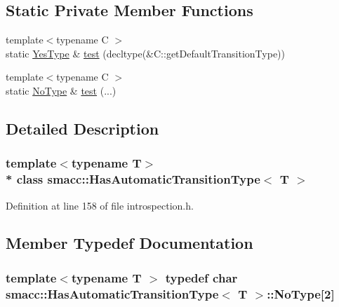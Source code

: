\subsection*{Static Private Member Functions}
\begin{DoxyCompactItemize}
\item 
{\footnotesize template$<$typename C $>$ }\\static \hyperlink{classsmacc_1_1HasAutomaticTransitionType_a0261cbc759cb52b6f60495d327a088a4}{Yes\+Type} \& \hyperlink{classsmacc_1_1HasAutomaticTransitionType_a21a21f4a8b478bd1a5305535c67dbc03}{test} (decltype(\&C\+::get\+Default\+Transition\+Type))
\item 
{\footnotesize template$<$typename C $>$ }\\static \hyperlink{classsmacc_1_1HasAutomaticTransitionType_a28c6f5359a0ce283d8f5705ed9fb0ceb}{No\+Type} \& \hyperlink{classsmacc_1_1HasAutomaticTransitionType_a86960eaf67ddae215927bc92d91a37f2}{test} (...)
\end{DoxyCompactItemize}


\subsection{Detailed Description}
\subsubsection*{template$<$typename T$>$\\*
class smacc\+::\+Has\+Automatic\+Transition\+Type$<$ T $>$}



Definition at line 158 of file introspection.\+h.



\subsection{Member Typedef Documentation}
\subsubsection[{\texorpdfstring{No\+Type}{NoType}}]{\setlength{\rightskip}{0pt plus 5cm}template$<$typename T $>$ typedef char {\bf smacc\+::\+Has\+Automatic\+Transition\+Type}$<$ T $>$\+::No\+Type\mbox{[}2\mbox{]}\hspace{0.3cm}{\ttfamily [private]}}\hypertarget{classsmacc_1_1HasAutomaticTransitionType_a28c6f5359a0ce283d8f5705ed9fb0ceb}{}\label{classsmacc_1_1HasAutomaticTransitionType_a28c6f5359a0ce283d8f5705ed9fb0ceb}


